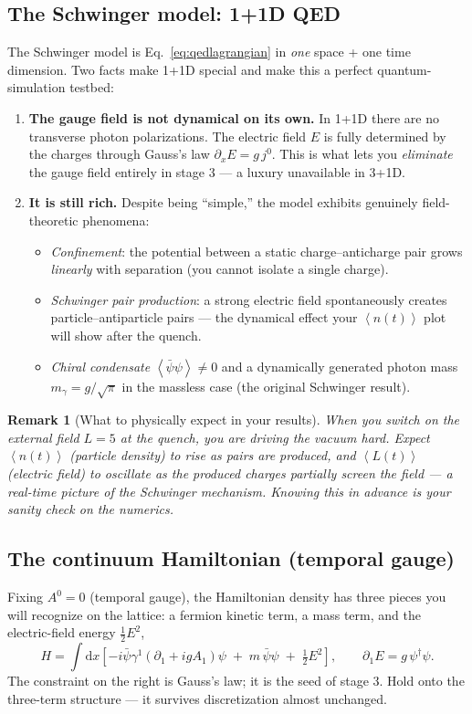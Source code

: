 \documentclass[11pt,a4paper]{article}
\newcommand{\ev}[1]{\left\langle#1\right\rangle}
\newcommand{\dd}{\mathrm{d}}
\newtheorem{remark}{Remark}[section]
\begin{document}
\subsection{The Schwinger model: 1+1D QED}
The Schwinger model is Eq.~\eqref{eq:qedlagrangian} in \emph{one} space + one time dimension. Two
facts make 1+1D special and make this a perfect quantum-simulation testbed:

\begin{enumerate}[leftmargin=1.5em]
\item \textbf{The gauge field is not dynamical on its own.} In 1+1D there are no transverse
photon polarizations. The electric field $E$ is fully determined by the charges through Gauss's law
$\partial_x E = g\,j^0$. This is what lets you \emph{eliminate} the gauge field entirely in stage 3
--- a luxury unavailable in 3+1D.
\item \textbf{It is still rich.} Despite being ``simple,'' the model exhibits genuinely
field-theoretic phenomena:
\begin{itemize}[nosep]
\item \emph{Confinement}: the potential between a static charge--anticharge pair grows
\emph{linearly} with separation (you cannot isolate a single charge).
\item \emph{Schwinger pair production}: a strong electric field spontaneously creates
particle--antiparticle pairs --- the dynamical effect your $\ev{n(t)}$ plot will show after the
quench.
\item \emph{Chiral condensate} $\ev{\bar\psi\psi}\neq 0$ and a dynamically generated photon mass
$m_\gamma = g/\sqrt{\pi}$ in the massless case (the original Schwinger result).
\end{itemize}
\end{enumerate}

\begin{remark}[What to physically expect in your results]
When you switch on the external field $L=5$ at the quench, you are driving the vacuum hard. Expect
$\ev{n(t)}$ (particle density) to \emph{rise} as pairs are produced, and $\ev{L(t)}$ (electric
field) to oscillate as the produced charges partially screen the field --- a real-time picture of
the Schwinger mechanism. Knowing this in advance is your sanity check on the numerics.
\end{remark}

\subsection{The continuum Hamiltonian (temporal gauge)}
Fixing $A^0=0$ (temporal gauge), the Hamiltonian density has three pieces you will recognize on the
lattice: a fermion kinetic term, a mass term, and the electric-field energy $\tfrac12 E^2$,
\begin{equation}
H = \int \dd x\left[ -i\bar\psi\gamma^1(\partial_1 + igA_1)\psi \;+\; m\,\bar\psi\psi \;+\; \tfrac12 E^2\right],
\qquad \partial_1 E = g\,\psi^\dagger\psi .
\label{eq:contH}
\end{equation}
The constraint on the right is Gauss's law; it is the seed of stage 3. Hold onto the three-term
structure --- it survives discretization almost unchanged.
\end{document}
